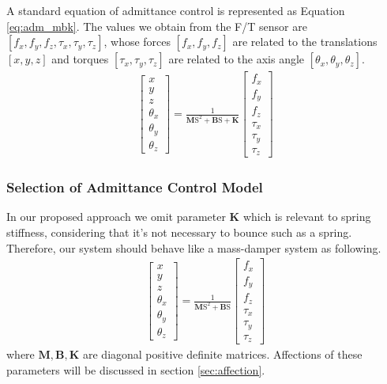 \par
A standard equation of admittance control is represented as Equation \ref{eq:adm_mbk}. The values we obtain from the F/T sensor are $\left[f_x, f_y, f_z,\tau _x, \tau _y, \tau _z \right]$, whose forces $ \left[f_x, f_y, f_z\right]$ are related to the translations $ \left[x, y, z\right]$ and torques $ \left[\tau _x, \tau _y, \tau _z\right]$ are related to the axis angle $ \left[\theta _x,\theta _y,\theta _z\right]$. 
\begin{equation}
\label{eq:adm_mbk}
\begin{split}
\begin{bmatrix}
x \\
y \\
z \\
\theta _x \\
\theta _y \\
\theta _z 
\end{bmatrix}
=
\frac{1}{\mathbf{M}\mathrm{S}^2+\mathbf{B}\mathrm{S}+\mathbf{K}}
\begin{bmatrix}
f_x \\
f_y \\
f_z \\
\tau _x \\
\tau _y \\
\tau _z 
\end{bmatrix}
\end{split}
\end{equation}
\subsubsection{Selection of Admittance Control Model}
In our proposed approach we omit parameter $\mathbf{K}$ which is relevant to spring stiffness, considering that it's not necessary to bounce such as a spring. Therefore, our system should behave like a mass-damper system as following.
\begin{equation}
\label{eq:adm_mb}
\begin{split}
\begin{bmatrix}
x \\
y \\
z \\
\theta _x \\
\theta _y \\
\theta _z 
\end{bmatrix}
=
\frac{1}{\mathbf{M}\mathrm{S}^2+\mathbf{B}\mathrm{S}}
\begin{bmatrix}
f_x \\
f_y \\
f_z \\
\tau _x \\
\tau _y \\
\tau _z 
\end{bmatrix}
\end{split}
\end{equation}
where $\mathbf{M},\mathbf{B},\mathbf{K}$ are diagonal positive definite matrices. Affections of these parameters will be discussed in section \ref{sec:affection}.
